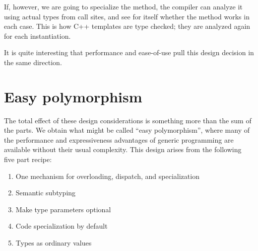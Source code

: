 
If, however, we are going to specialize the method, the compiler can analyze it
using actual types from call sites, and see for itself whether the method works
in each case.
This is how C++ templates are type checked; they are analyzed again for each
instantiation.

It is quite interesting that performance and ease-of-use pull this design
decision in the same direction.


\section{Easy polymorphism}



The total effect of these design considerations is something more than the
sum of the parts.
We obtain what might be called ``easy polymorphism'', where many of the performance
and expressiveness advantages of generic programming are available without
their usual complexity.
This design arises from the following five part recipe:

\vspace{-3ex}
\begin{singlespace}
\begin{enumerate}
\item One mechanism for overloading, dispatch, and specialization
\item Semantic subtyping
\item Make type parameters optional
\item Code specialization by default
\item Types as ordinary values
\end{enumerate}
\end{singlespace}

